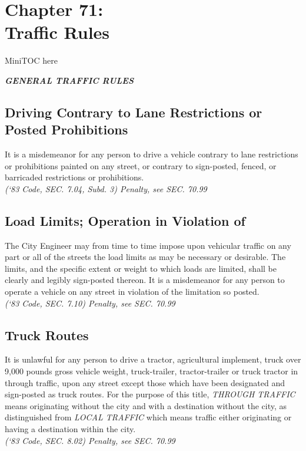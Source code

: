 %
\chapter*{Chapter 71: \\
	Traffic Rules}

MiniTOC here
\pagebreak


\begin{center}
\emph{\textbf{\LARGE{GENERAL TRAFFIC RULES}}}
\end{center}
\section{Driving Contrary to Lane Restrictions or Posted Prohibitions}
It is a misdemeanor for any person to drive a vehicle contrary to lane restrictions or prohibitions painted on any street, or contrary to sign-posted, fenced, or barricaded restrictions or prohibitions.\\
\emph{(‘83 Code, SEC. 7.04, Subd. 3) Penalty, see SEC. 70.99}
\section{Load Limits; Operation in Violation of}
The City Engineer may from time to time impose upon vehicular traffic on any part or all of the streets the load limits as may be necessary or desirable. The limits, and the specific extent or weight to which loads are limited, shall be clearly and legibly sign-posted thereon. It is a misdemeanor for any person to operate a vehicle on any street in violation of the limitation so posted.\\
\emph{(‘83 Code, SEC. 7.10) Penalty, see SEC. 70.99}
\section{Truck Routes}
It is unlawful for any person to drive a tractor, agricultural implement, truck over 9,000 pounds gross vehicle weight, truck-trailer, tractor-trailer or truck tractor in through traffic, upon any street except those which have been designated and sign-posted as truck routes.  For the purpose of this title, \emph{THROUGH TRAFFIC} means originating without the city and with a destination without the city, as distinguished from \emph{LOCAL TRAFFIC} which means traffic either originating or having a destination within the city.\\
\emph{(‘83 Code, SEC. 8.02) Penalty, see SEC. 70.99}

